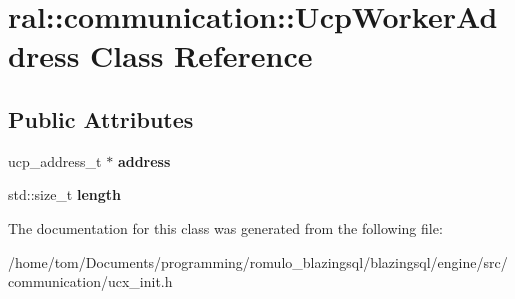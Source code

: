 \hypertarget{classral_1_1communication_1_1UcpWorkerAddress}{}\section{ral\+:\+:communication\+:\+:Ucp\+Worker\+Address Class Reference}
\label{classral_1_1communication_1_1UcpWorkerAddress}
\subsection*{Public Attributes}
\begin{DoxyCompactItemize}
\item 
\mbox{\label{classral_1_1communication_1_1UcpWorkerAddress_a862fcab34b3769624aeeea9585e18e41}} 
ucp\+\_\+address\+\_\+t $\ast$ {\bfseries address}
\item 
\mbox{\label{classral_1_1communication_1_1UcpWorkerAddress_ae87d67a5a08eebef5c1e8aa13ee0ab94}} 
std\+::size\+\_\+t {\bfseries length}
\end{DoxyCompactItemize}


The documentation for this class was generated from the following file\+:\begin{DoxyCompactItemize}
\item 
/home/tom/\+Documents/programming/romulo\+\_\+blazingsql/blazingsql/engine/src/communication/ucx\+\_\+init.\+h\end{DoxyCompactItemize}
